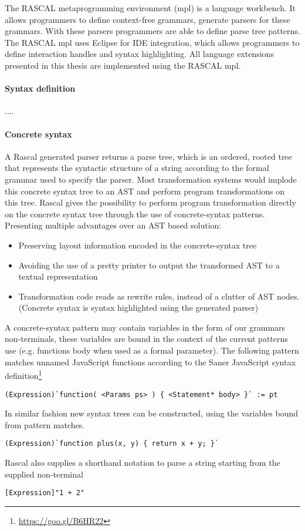 The RASCAL\cite{Klint} metaprogramming environment (mpl) is a language workbench. It allows programmers to define context-free grammars, generate parsers for these grammars. With these parsers programmers are able to define parse tree patterns. The RASCAL mpl uses Eclipse for IDE integration, which allows programmers to define interaction handles and syntax highlighting. All language extensions presented in this thesis are implemented using the RASCAL mpl.

\paragraph{Syntax definition}
....

\paragraph{Concrete syntax}
A Rascal generated parser returns a parse tree, which is an ordered, rooted tree that represents the syntactic structure of a string according to the formal grammar used to specify the parser. Most transformation systems would implode this concrete syntax tree to an AST and perform program transformations on this tree. Rascal gives the possibility to perform program transformation directly on the concrete syntax tree through the use of concrete-syntax patterns. Presenting multiple advantages over an AST based solution:
\begin{itemize}
	\item Preserving layout information encoded in the concrete-syntax tree
	\item Avoiding the use of a pretty printer to output the transformed AST to a textual representation
	\item Transformation code reads as rewrite rules, instead of a clutter of AST nodes. (Concrete syntax is syntax highlighted using the generated parser)
\end{itemize}
A concrete-syntax pattern may contain variables in the form of our grammars non-terminals, these variables are bound in the context of the current patterns use (e.g. functions body when used as a formal parameter). The following pattern matches unnamed JavaScript functions according to the Saner JavaScript syntax definition\footnote{\url{https://goo.gl/B6HR22}}

\begin{lstlisting}
(Expression)`function( <Params ps> ) { <Statement* body> }` := pt
\end{lstlisting}

In similar fashion new syntax trees can be constructed, using the variables bound from pattern matches.

\begin{lstlisting}
(Expression)`function plus(x, y) { return x + y; }`
\end{lstlisting}

Rascal also supplies a shorthand notation to parse a string starting from the supplied non-terminal

\begin{lstlisting}
[Expression]"1 + 2"
\end{lstlisting}